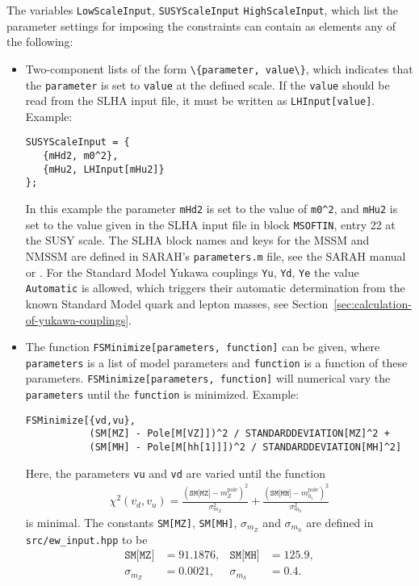 \documentclass[final,3p,11pt,pdflatex]{elsarticle}
\newcommand{\code}[1]{\lstinline|#1|}  %
\newcommand{\pole}{\text{pole}}
\newcommand{\secref}[1]{Section~\ref{#1}}
\begin{document}
%
The variables \code{LowScaleInput}, \code{SUSYScaleInput}
\code{HighScaleInput}, which list the parameter settings for imposing
the constraints can contain as elements any of the following:
%
\begin{itemize}
\item Two-component lists of the form \code{\{parameter, value\}},
  which indicates that the \code{parameter} is set to \code{value} at
  the defined scale.  If the \code{value} should be read from the SLHA
  input file, it must be written as \code{LHInput[value]}.  Example:
  \begin{lstlisting}
SUSYScaleInput = {
   {mHd2, m0^2},
   {mHu2, LHInput[mHu2]}
};
  \end{lstlisting}
  In this example the parameter \code{mHd2} is set to the value of
  \code{m0^2}, and \code{mHu2} is set to the value given in the SLHA
  input file in block \code{MSOFTIN}, entry 22 at the SUSY scale.  The
  SLHA block names and keys for the MSSM and NMSSM are defined in
  SARAH's \code{parameters.m} file, see the SARAH manual or
  \cite{Staub:2010jh}.  For the Standard Model Yukawa couplings
  \code{Yu}, \code{Yd}, \code{Ye} the value \code{Automatic} is
  allowed, which triggers their automatic determination from the known
  Standard Model quark and lepton masses, see
  \secref{sec:calculation-of-yukawa-couplings}.

\item The function \code{FSMinimize[parameters, function]} can be
  given, where \code{parameters} is a list of model parameters and
  \code{function} is a function of these parameters.
  \code{FSMinimize[parameters, function]} will numerical vary the
  \code{parameters} until the \code{function} is minimized.  Example:
  \begin{lstlisting}
FSMinimize[{vd,vu},
           (SM[MZ] - Pole[M[VZ]])^2 / STANDARDDEVIATION[MZ]^2 +
           (SM[MH] - Pole[M[hh[1]]])^2 / STANDARDDEVIATION[MH]^2]
  \end{lstlisting}
  Here, the parameters \code{vu} and \code{vd} are varied until the
  function
  \begin{align}
    \chi^2(v_d,v_u) =
    \frac{(\texttt{SM[MZ]}-m_Z^\pole)^2}{\sigma_{m_Z}^2} +
    \frac{(\texttt{SM[MH]}-m_{h_1}^\pole)^2}{\sigma_{m_h}^2}
  \end{align}
  is minimal.  The constants \code{SM[MZ]}, \code{SM[MH]},
  $\sigma_{m_Z}$ and $\sigma_{m_h}$ are defined in
  \code{src/ew_input.hpp} to be
  \begin{align}
    \texttt{SM[MZ]} &= 91.1876, &
    \texttt{SM[MH]} &= 125.9, \\
    \sigma_{m_Z} &= 0.0021, &
    \sigma_{m_h} &= 0.4 .
  \end{align}


\end{itemize}
\end{document}
